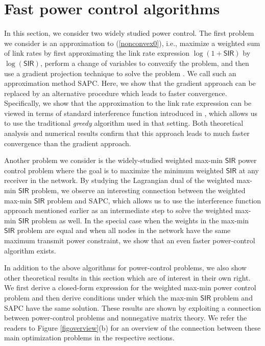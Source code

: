\documentclass[10pt,twocolumn]{IEEEtran}
\newcommand{\0}{\mathbf{0}}
\newcommand{\1}{\mathbf{1}}
\begin{document}
\section{Fast power control algorithms}
\label{algorithms}
In this section, we consider two widely studied power control. The first 
problem we consider is an approximation to (\ref{nonconvex0}), i.e., maximize a 
weighted sum of link rates by first approximating the link rate expression 
$\log(1+\mathsf{SIR})$ by $\log(\mathsf{SIR})$, perform a change of variables to convexify 
the problem, and then use a gradient projection technique to solve the 
problem \cite{Chiang07,Chiang05,Stanczak07}. We call such an approximation method SAPC. Here, we show that the gradient approach can 
be replaced by an alternative procedure which leads to faster 
convergence.  Specifically, we show that the 
approximation to the link rate expression can be viewed in terms of standard
interference function introduced in \cite{Yates95}, which allows us 
to use the traditional \emph{greedy} algorithm used in that setting. 
Both theoretical analysis and numerical results confirm that this 
approach leads to much faster convergence than the gradient approach.

Another problem we consider is the widely-studied weighted max-min $\mathsf{SIR}$ 
power control problem where the goal is to maximize the minimum weighted 
$\mathsf{SIR}$ at any receiver in the network. By studying the Lagrangian dual of 
the weighted max-min $\mathsf{SIR}$ problem, we observe an interesting connection 
between the weighted max-min $\mathsf{SIR}$ problem and SAPC, which allows us to 
use the interference function approach mentioned earlier as an 
intermediate step to solve the weighted max-min $\mathsf{SIR}$ problem as well. In 
the special case when the weights in the max-min $\mathsf{SIR}$ problem are equal 
and when all nodes in the network have the same maximum transmit power 
constraint, we show that an even faster power-control algorithm exists.

In addition to the above algorithms for power-control problems, we also 
show other theoretical results in this section which are of interest in 
their own right. We first derive a closed-form expression for the 
weighted max-min power control problem and then derive conditions under 
which the max-min $\mathsf{SIR}$ problem and SAPC have the same solution. These 
results are shown by exploiting a connection between power-control 
problems and nonnegative matrix theory. We refer the readers to Figure \ref{figoverview}(b) for an overview of the connection between these main optimization problems in the respective sections.
\end{document}
